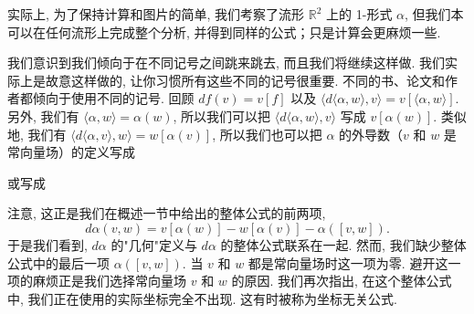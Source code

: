 实际上, 为了保持计算和图片的简单, 我们考察了流形 $\mathbb{R}^2$ 上的 1-形式 $\alpha$, 但我们本可以在任何流形上完成整个分析, 并得到同样的公式；只是计算会更麻烦一些.

我们意识到我们倾向于在不同记号之间跳来跳去, 而且我们将继续这样做. 我们实际上是故意这样做的, 让你习惯所有这些不同的记号很重要. 不同的书、论文和作者都倾向于使用不同的记号. 回顾 $df(v)=v[f]$ 以及 $\bigl\langle d\langle\alpha,w\rangle,v\bigr\rangle=v[\langle\alpha,w\rangle]$. 另外, 我们有 $\langle\alpha,w\rangle=\alpha(w)$, 所以我们可以把 $\bigl\langle d\langle\alpha,w\rangle,v\bigr\rangle$ 写成 $v[\alpha(w)]$. 类似地, 我们有 $\bigl\langle d\langle\alpha,v\rangle,w\bigr\rangle=w[\alpha(v)]$, 所以我们也可以把 $\alpha$ 的外导数（$v$ 和 $w$ 是常向量场）的定义写成
\begin{center}
\end{center}
或写成
\begin{center}
\end{center}

注意, 这正是我们在概述一节中给出的整体公式的前两项, 
\[
d\alpha(v,w)=v[\alpha(w)]-w[\alpha(v)]-\alpha([v,w]).
\]
于是我们看到, $d\alpha$ 的"几何"定义与 $d\alpha$ 的整体公式联系在一起. 然而, 我们缺少整体公式中的最后一项 $\alpha([v,w])$. 当 $v$ 和 $w$ 都是常向量场时这一项为零. 避开这一项的麻烦正是我们选择常向量场 $v$ 和 $w$ 的原因. 我们再次指出, 在这个整体公式中, 我们正在使用的实际坐标完全不出现. 这有时被称为坐标无关公式.

